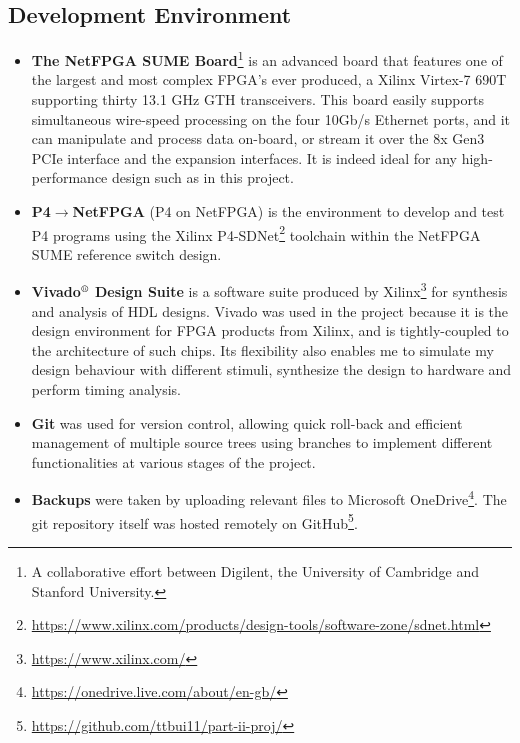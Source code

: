 	\subsection{Development Environment}
	\begin{itemize}%
		\item \textbf{The NetFPGA SUME Board}\footnote{A collaborative effort between Digilent, the University of Cambridge and Stanford University.} is an advanced board that features one of the largest and most complex FPGA’s ever produced, a Xilinx Virtex-7 690T supporting thirty 13.1 GHz GTH transceivers. This board easily supports simultaneous wire-speed processing on the four 10Gb/s Ethernet ports, and it can manipulate and process data on-board, or stream it over the 8x Gen3 PCIe interface and the expansion interfaces. It is indeed ideal for any high-performance design such as in this project.
					
		\item \textbf{P4$\rightarrow$NetFPGA} (P4 on NetFPGA) is the environment to develop and test P4 programs using the Xilinx P4-SDNet\footnote{\url{https://www.xilinx.com/products/design-tools/software-zone/sdnet.html}} toolchain within the NetFPGA SUME reference switch design.
		
		\item \textbf{Vivado$^{\textrm{\textregistered}}$ Design Suite} is a software suite produced by Xilinx\footnote{\url{https://www.xilinx.com/}} for synthesis and analysis of HDL designs. Vivado was used in the project because it is the design environment for FPGA products from Xilinx, and is tightly-coupled to the architecture of such chips. Its flexibility also enables me to simulate my design behaviour with different stimuli, synthesize the design to hardware and perform timing analysis.
		
		\item \textbf{Git} was used for version control, allowing quick roll-back and efficient management of multiple source trees using branches to implement different functionalities at various stages of the project.
	
		\item \textbf{Backups} were taken by uploading relevant files to Microsoft OneDrive\footnote{\url{https://onedrive.live.com/about/en-gb/}}. The git repository itself was hosted remotely on GitHub\footnote{\url{https://github.com/ttbui11/part-ii-proj/}}.
	\end{itemize}

